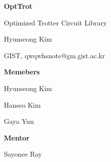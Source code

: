 \documentclass[a4paper,12pt]{article}
\newcommand{\courseName}{2024 IonQ summer Mentoring}
\newcommand{\assignmentTitle}{OptTrot}
\begin{document}
\begin{center}

    \vspace{0.5cm}
    {\Large\bfseries \assignmentTitle \par}
    {\large Optimized Trotter Circuit Library \par}
    \vspace{1cm}
    {
    \noindent
    Hyunseong Kim

    GIST, qwqwhsnote@gm.gist.ac.kr
    \vspace{0.5cm}

    \begin{minipage}{0.45\textwidth}
        \centering
        \textbf{Memebers}

        Hyunseong Kim

        Hanseo Kim
        
        Gaya Yun
    \end{minipage}
    \begin{minipage}{0.45\textwidth}
        \centering
        \textbf{Mentor}

        Sayonee Ray
    \end{minipage}
    }
    \begin{abstract}
        OptTrot is a library of generating optimized Trotter circuit for a given hamiltonian.
        Trotterization is a standard way to accomplish time evolution circuit on gate model
        computer, however, their long depth circuit has significantly contributed to 
        the hurdle of practical application.
        In the library, we combined commuting partition method and Pauli Frame search method.
        If the given Pauli term mutually commuted with Pauli Frame axis, then the Clifford gate
        combination was reduced to combinations of CX gate. 
        Moreover, their specific decomposition
        is easily derived from Gauss elimination of matrix over module 2 field, $\mathbb{Z}/2 \mathbb{Z}$.
        In the library, the overall process are easily achieved by convenience interfaces.
        Furthermore, researchers could combine the library with various optimization tools from classic 
        to quantum methods for partitioning of Pauli terms.
    \end{abstract}
\end{center}
\end{document}
